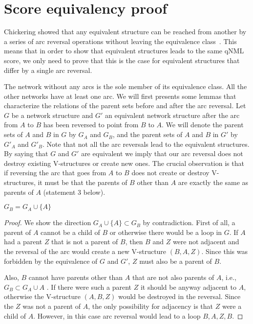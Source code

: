 \section{Score equivalency proof}

Chickering showed that any equivalent structure can be reached from
another by a series of arc reversal operations without leaving the
equivalence class~\cite{Chick95}. This means that in order to show
that equivalent structures leads to the same qNML score, we only need
to prove that this is the case for equivalent structures that differ
by a single arc reversal. 

The network without any arcs is the sole member of its equivalence
class. All the other networks have at least one arc. We will first
presents some lemmas that characterize the relations of the parent sets
before and after the arc reversal. Let $G$ be a network structure
and $G'$ an equivalent network structure after the arc from $A$
to $B$ has been reversed to point from $B$ to $A$. We
will denote the parent sets of $A$ and $B$ in $G$ by $G_{A}$
and $G_{B}$, and the parent sets of $A$ and $B$ in $G'$ by $G'_{A}$
and $G'_{B}$. Note that not all the arc reversals lead to the equivalent
structures. By saying that $G$ and $G'$ are equivalent we imply
that our arc reversal does not destroy existing V-structures or create
new ones. The crucial observation is that if reversing the arc that
goes from $A$ to $B$ does not create or destroy V-structures, it
must be that the parents of $B$ other than $A$ are exactly the same
as parents of $A$ (statement 3 below). 

\begin{lemma}\label{thm:sameparents}
\item $G_{B}=G_{A}\cup\{A\}$
\end{lemma}

\begin{proof}
We show the direction $G_{A}\cup\{A\}\subset G_{B}$ 
by contradiction. First of all, a parent of $A$ cannot be a child
of $B$ or otherwise there would be a loop in $G.$ If $A$ had a
parent $Z$ that is not a parent of $B$, then $B$ and $Z$ were
not adjacent and the reversal of the arc would create a new V-structure
$(B,A,Z)$. Since this was forbidden by the equivalence of $G$ and
$G'$, $Z$ must also be a parent of $B$. 

Also, $B$ cannot have parents other than $A$ that are not also parents
of $A$, i.e., $G_{B}\subset G_{A}\cup{A}$ . If there were such
a parent $Z$ it should be anyway adjacent to $A$, otherwise the
V-structure $(A,B,Z)$ would be destroyed in the reversal. Since the
$Z$ was not a parent of $A$, the only possibility for adjacency
is that $Z$ were a child of $A$. However, in this case arc reversal
would lead to a loop $B,A,Z,B$.
\end{proof}

